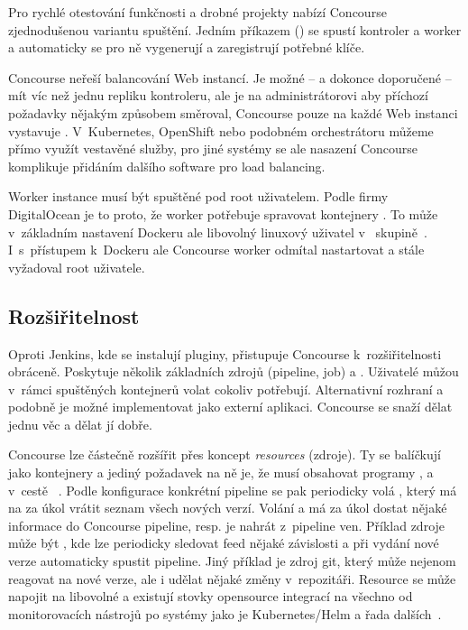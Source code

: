         Pro rychlé otestování funkčnosti a drobné projekty nabízí Concourse zjednodušenou variantu spuštění. Jedním příkazem () se spustí kontroler a worker a automaticky se pro ně vygenerují a zaregistrují potřebné klíče.

        Concourse neřeší balancování Web instancí. Je možné -- a dokonce doporučené -- mít víc než jednu repliku kontroleru, ale je na administrátorovi aby příchozí požadavky nějakým způsobem směroval, Concourse pouze na každé Web instanci vystavuje  . V~Kubernetes, OpenShift nebo podobném orchestrátoru můžeme přímo využít vestavěné služby, pro jiné systémy se ale nasazení Concourse komplikuje přidáním dalšího software pro load balancing.

        Worker instance musí být spuštěné pod root uživatelem. Podle firmy DigitalOcean je to proto, že worker potřebuje spravovat kontejnery . To může v~základním nastavení Dockeru ale libovolný linuxový uživatel v~ skupině~\cite{docker-postinstall}. I~s~přístupem k~Dockeru ale Concourse worker odmítal nastartovat a stále vyžadoval root uživatele.

    \subsection{Rozšiřitelnost}
        Oproti Jenkins, kde se instalují pluginy, přistupuje Concourse k~rozšiřitelnosti obráceně. Poskytuje několik základních zdrojů (pipeline, job) a . Uživatelé můžou v~rámci spuštěných kontejnerů volat cokoliv potřebují. Alternativní rozhraní a podobně je možné implementovat jako externí aplikaci. Concourse se snaží dělat jednu věc a dělat jí dobře.

        Concourse lze částečně rozšířit přes koncept \textit{resources} (zdroje). Ty se balíčkují jako kontejnery a jediný požadavek na ně je, že musí obsahovat programy ,  a  v~cestě ~\cite{concourse-resource}. Podle konfigurace konkrétní pipeline se pak periodicky volá , který má na za úkol vrátit seznam všech nových verzí. Volání  a  má za úkol dostat nějaké informace do Concourse pipeline, resp. je nahrát z~pipeline ven. Příklad zdroje může být , kde lze periodicky sledovat feed nějaké závislosti a při vydání nové verze automaticky spustit pipeline. Jiný příklad je zdroj git, který může nejenom reagovat na nové verze, ale i udělat nějaké změny v~repozitáři. Resource se může napojit na libovolné  a existují stovky opensource integrací na všechno od monitorovacích nástrojů po \CD systémy jako je Kubernetes/Helm a řada dalších~\cite{concourse-resource-list}.

